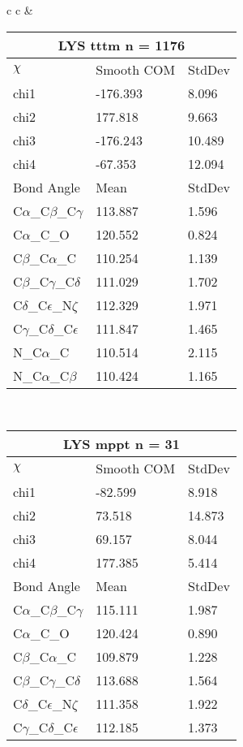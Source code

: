 \begin{longtable}{ c c }
  &
  \begin{tabular}{ l l l }
  \toprule
  \multicolumn{3}{c}{LYS \textbf{tttm} n = 1176} \\ \toprule
  $\chi$       & Smooth COM & StdDev \\ \midrule
  chi1 & -176.393 & 8.096 \\ 
  chi2 & 177.818 & 9.663 \\ 
  chi3 & -176.243 & 10.489 \\ 
  chi4 & -67.353 & 12.094 \\ \midrule
  Bond Angle   & Mean     & StdDev \\ \midrule
  C$\alpha$\_C$\beta$\_C$\gamma$ & 113.887 & 1.596\\
  C$\alpha$\_C\_O & 120.552 & 0.824\\
  C$\beta$\_C$\alpha$\_C & 110.254 & 1.139\\
  C$\beta$\_C$\gamma$\_C$\delta$ & 111.029 & 1.702\\
  C$\delta$\_C$\epsilon$\_N$\zeta$ & 112.329 & 1.971\\
  C$\gamma$\_C$\delta$\_C$\epsilon$ & 111.847 & 1.465\\
  N\_C$\alpha$\_C & 110.514 & 2.115\\
  N\_C$\alpha$\_C$\beta$ & 110.424 & 1.165\\
  \bottomrule
  \end{tabular}
  \\
  \begin{tabular}{ l l l }
  \toprule
  \multicolumn{3}{c}{LYS \textbf{mppt} n = 31} \\ \toprule
  $\chi$       & Smooth COM & StdDev \\ \midrule
  chi1 & -82.599 & 8.918 \\ 
  chi2 & 73.518 & 14.873 \\ 
  chi3 & 69.157 & 8.044 \\ 
  chi4 & 177.385 & 5.414 \\ \midrule
  Bond Angle   & Mean     & StdDev \\ \midrule
  C$\alpha$\_C$\beta$\_C$\gamma$ & 115.111 & 1.987\\
  C$\alpha$\_C\_O & 120.424 & 0.890\\
  C$\beta$\_C$\alpha$\_C & 109.879 & 1.228\\
  C$\beta$\_C$\gamma$\_C$\delta$ & 113.688 & 1.564\\
  C$\delta$\_C$\epsilon$\_N$\zeta$ & 111.358 & 1.922\\
  C$\gamma$\_C$\delta$\_C$\epsilon$ & 112.185 & 1.373\\

\end{tabular}
\end{longtable}
